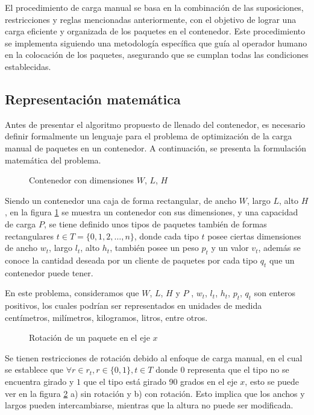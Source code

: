 El procedimiento de carga manual se basa en la combinación de las suposiciones, restricciones y reglas mencionadas anteriormente, con el objetivo de lograr una carga eficiente y organizada de los paquetes en el contenedor. Este procedimiento se implementa siguiendo una metodología específica que guía al operador humano en la colocación de los paquetes, asegurando que se cumplan todas las condiciones establecidas.

\subsection{Representación matemática}

Antes de presentar el algoritmo propuesto de llenado del contenedor, es necesario definir formalmente un lenguaje para el problema de optimización de la carga manual de paquetes en un contenedor. A continuación, se presenta la formulación matemática del problema.

\begin{figure}[H]
    \centering
    
    \caption{Contenedor con dimensiones $W$, $L$, $H$}
    \label{fig:container}
\end{figure}

Siendo un contenedor una caja de forma rectangular, de ancho $W$, largo $L$, alto $H$, en la figura \ref{fig:container} se muestra un contenedor con sus dimensiones, y una capacidad de carga $P$, se tiene definido unos tipos de paquetes también de formas rectangulares $t \in T = \{0, 1, 2, \ldots, n\}$, donde cada tipo $t$ posee ciertas dimensiones de ancho $w_t$, largo $l_t$, alto $h_t$, también posee un peso $p_t$ y un valor $v_t$, además se conoce la cantidad deseada por un cliente de paquetes por cada tipo $q_t$ que un contenedor puede tener.

En este problema, consideramos que $W$, $L$, $H$ y $P$ , $w_t$, $l_t$, $h_t$, $p_t$, $q_t$ son enteros positivos, los cuales podrían ser representados en unidades de medida centímetros, milímetros, kilogramos, litros, entre otros.

\begin{figure}[H]
    \centering
    
    \caption{Rotación de un paquete en el eje $x$}
    \label{fig:rotation}
\end{figure}

Se tienen restricciones de rotación debido al enfoque de carga manual, en el cual se establece que $\forall r \in r_t, r \in \{0, 1\}, t \in T$ donde $0$ representa que el tipo no se encuentra girado y $1$ que el tipo está girado 90 grados en el eje $x$, esto se puede ver en la figura \ref{fig:rotation} a) sin rotación y b) con rotación. Esto implica que los anchos y largos pueden intercambiarse, mientras que la altura no puede ser modificada.

